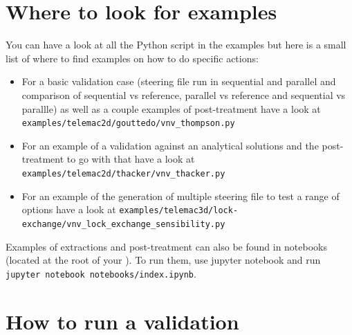 \section{Where to look for examples}
You can have a look at all the Python script in the examples but here is a
small list of where to find examples on how to do specific actions:
\begin{itemize}
\item For a basic validation case (steering file run in sequential and parallel
  and comparison of sequential vs reference, parallel vs reference and
  sequential vs parallle) as well as a couple examples of post-treatment have a
  look at \verb!examples/telemac2d/gouttedo/vnv_thompson.py!
\item For an example of a validation against an analytical solutions and the
  post-treatment to go with that have a look at
    \verb!examples/telemac2d/thacker/vnv_thacker.py!
\item For an example of the generation of multiple steering file to test a
  range of options have a look at
    \verb!examples/telemac3d/lock-exchange/vnv_lock_exchange_sensibility.py!
\end{itemize}

Examples of extractions and post-treatment can also be found in notebooks
(located at the root of your \telemacsystem). To run them, use jupyter notebook
and run \verb!jupyter notebook notebooks/index.ipynb!.

\section{How to run a validation}

